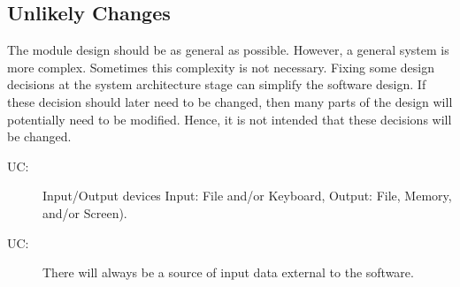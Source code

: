 \documentclass[12pt, titlepage]{article}
\newcounter{ucnum}
\newcommand{\uctheucnum}{UC\theucnum}
\begin{document}
	\subsection{Unlikely Changes} \label{SecUchange}
	The module design should be as general as possible. However, a general 
	system is more complex. Sometimes this complexity is not necessary. Fixing 
	some design decisions at the system architecture stage can simplify the 
	software design. If these decision should later need to be changed, then 
	many parts of the design will potentially need to be modified. Hence, it is 
	not intended that these decisions will be changed.
	\begin{description}
		\item[ \uctheucnum \label{ucIO}:] Input/Output 
		devices Input: File and/or Keyboard, Output: File, Memory, and/or 
		Screen).
		\item[ \uctheucnum \label{ucInput}:] There will 
		always be a source of input data external to the software.
	\end{description}
\end{document}
